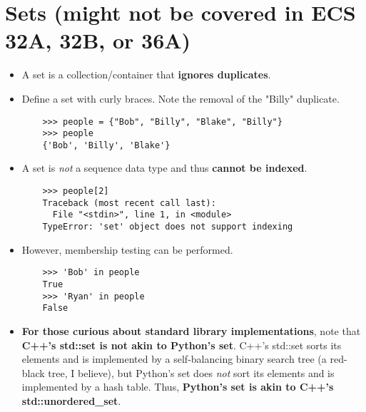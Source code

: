\documentclass{article}
\begin{document}
\section{Sets (might not be covered in ECS 32A, 32B, or 36A)}
\begin{itemize}
    \item A set is a collection/container that \textbf{ignores duplicates}.
    \item Define a set with curly braces. Note the removal of the "Billy" duplicate.
    \begin{lstlisting}
    >>> people = {"Bob", "Billy", "Blake", "Billy"}
    >>> people
    {'Bob', 'Billy', 'Blake'}
    \end{lstlisting}
    \item A set is \textit{not} a sequence data type and thus \textbf{cannot be indexed}.
    \begin{lstlisting}
    >>> people[2]
    Traceback (most recent call last):
      File "<stdin>", line 1, in <module>
    TypeError: 'set' object does not support indexing
    \end{lstlisting}
    \item However, membership testing can be performed.
    \begin{lstlisting}
    >>> 'Bob' in people
    True
    >>> 'Ryan' in people
    False
    \end{lstlisting}
    \item \textbf{For those curious about standard library implementations}, note that \textbf{C++'s std::set is not akin to Python's set}. C++'s std::set sorts its elements and is implemented by a self-balancing binary search tree (a red-black tree, I believe), but Python's set does \textit{not} sort its elements and is implemented by a hash table. Thus, \textbf{Python's set is akin to C++'s std::unordered\_set}.
\end{itemize}
\end{document}
